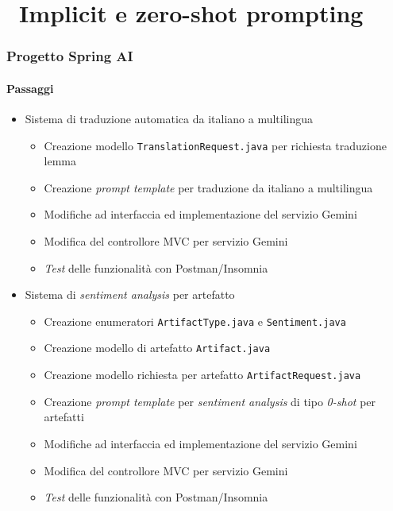\section{\faWrench\ Implicit e zero-shot prompting} %
\label{sec:spring-ai-gemini-implicit-zero-shot-prompting}
%
\begin{frame}[t,fragile] \frametitle{Progetto Spring AI}
    \framesubtitle{Passaggi}
    {\small
        \begin{itemize}[leftmargin=10pt,align=right]
            \item[\alert{\faArrowCircleRight}] Sistema di \alert{traduzione automatica} da italiano a multilingua
            \begin{itemize}[leftmargin=10pt,align=right]
                \item[\alertedcircled{1}] Creazione modello \texttt{TranslationRequest.java} per richiesta traduzione lemma
                \item[\alertedcircled{2}] Creazione \textit{prompt template} per traduzione da italiano a multilingua 
                \item[\alertedcircled{3}] Modifiche ad interfaccia ed implementazione del servizio Gemini
                \item[\alertedcircled{4}] Modifica del controllore MVC per servizio Gemini
                \item[\alertedcircled{5}] \textit{Test} delle funzionalità con Postman/Insomnia           
            \end{itemize}
            \item[\alert{\faArrowCircleRight}] Sistema di \alert{\textit{sentiment analysis}} per artefatto
            \begin{itemize}[leftmargin=10pt,align=right]
                \item[\alertedcircled{1}] Creazione enumeratori \texttt{ArtifactType.java} e \texttt{Sentiment.java}
                \item[\alertedcircled{2}] Creazione modello di artefatto \texttt{Artifact.java}
                \item[\alertedcircled{3}] Creazione modello richiesta per artefatto \texttt{ArtifactRequest.java}
                \item[\alertedcircled{4}] Creazione \textit{prompt template} per \textit{sentiment analysis} di tipo \textit{0-shot} per artefatti
                \item[\alertedcircled{5}] Modifiche ad interfaccia ed implementazione del servizio Gemini
                \item[\alertedcircled{6}] Modifica del controllore MVC per servizio Gemini
                \item[\alertedcircled{7}] \textit{Test} delle funzionalità con Postman/Insomnia
            \end{itemize}
        \end{itemize}
    }
\end{frame}
%
